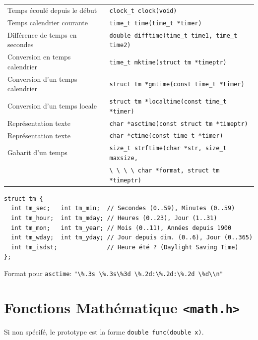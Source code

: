 \documentclass{article}
\newcommand{\cd}{\lstinline}
\begin{document}
\begin{multicols*}{3}
\begin{tabularx}{\linewidth}{Xl}
  Temps écoulé depuis le début & \cd{clock_t clock(void)} \\
  Temps calendrier courante & \cd{time_t time(time_t *timer)} \\
  Différence de temps en secondes & \cd{double difftime(time_t time1, time_t time2)} \\
  Conversion en temps calendrier & \cd{time_t mktime(struct tm *timeptr)} \\
  Conversion d'un temps calendrier & \cd{struct tm *gmtime(const time_t *timer)} \\
  Conversion d'un temps locale & \cd{struct tm *localtime(const time_t *timer)} \\
  Représentation texte & \cd{char *asctime(const struct tm *timeptr)} \\
  Représentation texte & \cd{char *ctime(const time_t *timer)} \\
  Gabarit d'un temps & \cd{size_t strftime(char *str, size_t maxsize,} \\
                     & \cd{\ \ \ \ char *format, struct tm *timeptr)} \\
\end{tabularx}

{
\small
\begin{lstlisting}
struct tm {
  int tm_sec;   int tm_min;  // Secondes (0..59), Minutes (0..59)
  int tm_hour;  int tm_mday; // Heures (0..23), Jour (1..31)
  int tm_mon;   int tm_year; // Mois (0..11), Années depuis 1900
  int tm_wday;  int tm_yday; // Jour depuis dim. (0..6), Jour (0..365)
  int tm_isdst;              // Heure été ? (Daylight Saving Time)
};
\end{lstlisting}
}

Format pour \texttt{asctime}: \cd{"\%.3s \%.3s\%3d \%.2d:\%.2d:\%.2d \%d\\n"}

\section*{Fonctions Mathématique \texttt{<math.h>}}

Si non spécifé, le prototype est la forme \cd{double func(double x)}.


\end{multicols*}
\end{document}
